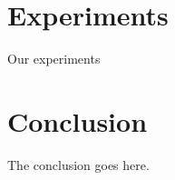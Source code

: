 \documentclass[journal,comsoc]{IEEEtran}
\let\MYoriglatexcaption\caption
\renewcommand{\caption}[2][\relax]{\MYoriglatexcaption[#2]{#2}}
\begin{document}


\section{Experiments}\label{sec:experiments}
Our experiments
\section{Conclusion}\label{sec:conclusion}
The conclusion goes here.

%
%



%
%
\end{document}
